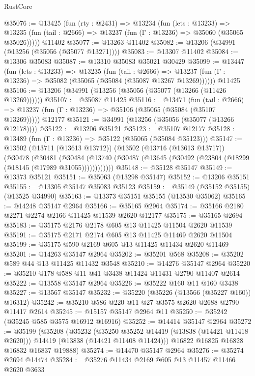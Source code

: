 \begin{lexlean}{RustCore}
\begin{coremodule}
@35076 := @13425
    (fun (rty : @2431) =>
    @13234
      (fun (lets : @13233) =>
      @13235 (fun (tail : @2666) => @13237 (fun (Γ : @13236) => @35060 (@35065 @35026)))))
    @11402
@35077 := @13263 @11402
@35082 := @13206 (@34991 (@13256 (@35056 (@35077 @13271))))
@35083 := @13307 @11402
@35084 := @13306 @35083
@35087 := @13310 @35083 @35021 @30429
@35099 := @13447
    (fun (lets : @13233) =>
    @13235
      (fun (tail : @2666) =>
      @13237 (fun (Γ : @13236) => @35082 (@35065 (@35084 (@35087 @13267 @13269))))))
    @11425
@35106 := @13206 (@34991 (@13256 (@35056 (@35077 (@13266 (@11426 @13269))))))
@35107 := @35087 @11425
@35116 := @13471
    (fun (tail : @2666) => @13237 (fun (Γ : @13236) => @35106 (@35065 (@35084 (@35107 @13269)))))
    @12177
@35121 := @34991 (@13256 (@35056 (@35077 (@13266 @12178))))
@35122 := @13206 @35121
@35123 := @35107 @12177
@35128 := @13489 (fun (Γ : @13236) => @35122 (@35065 (@35084 @35123)))
@35147 := @13502
    (@13711 (@13613 @13712))
    (@13502
      (@13716 (@13613 @13717))
      (@30478
        (@30481
          (@30484 (@13740 (@30487 (@13645 (@30492 (@23804 (@18299 (@18145 (@17989 @31055))))))))))))
@35148 := @35128 @35147
@35149 := @13373 @35121
@35151 := @35063 (@13298 @35147)
@35152 := @13206 @35151
@35155 := @13305 @35147 @35083 @35123
@35159 := @35149 (@35152 @35155) (@13525 @34990)
@35163 := @13373 @35151 @35155 (@13530 @35062)
@35165 := @14248 @35147 @2964
@35166 := @35165 @2964
@35174 := @35166 @2180 @2271 @2274 @2166 @11425 @11539 @2620 @12177
@35175 := @35165 @2694
@35183 := @35175 @2176 @2178 @605 @13 @11425 @11504 @2620 @11539
@35191 := @35175 @2171 @2174 @605 @13 @11425 @11469 @2620 @11504
@35199 := @35175 @590 @2169 @605 @13 @11425 @11434 @2620 @11469
@35201 := @14263 @35147 @2964
@35202 := @35201 @568
@35208 := @35202 @589 @44 @13 @11425 @11432 @3548
@35210 := @14276 @35147 @2964
@35220 := @35210 @178 @588 @11 @41 @3438 @11424 @11431 @2790 @11407 @2614
@35222 := @13558 @35147 @2964
@35226 := @35222 @160 @11 @160 @3438
@35227 := @13567 @35147
@35232 := @35220 (@35226 (@13566 (@35227 @160)) @16312)
@35242 := @35210 @586 @220 @11 @27 @3575 @2620 @2688 @2790 @11417 @2614
@35245 := @15157 @35147 @2964 @11
@35250 := @35242 (@35245 @585 @3575 @16912 @16916)
@35252 := @14414 @35147 @2964
@35272 := @35199
    (@35208
      (@35232
        (@35250 @35252 @14419 (@13838 (@14421 @11418 @2620)))
        @14419
        (@13838 (@14421 @11408 @11424)))
      @16822
      @16825
      @16828
      @16832
      @16837
      @19888)
@35274 := @14470 @35147 @2964
@35276 := @35274 @2694 @14474
@35284 := @35276 @11434 @2169 @605 @13 @11457 @11466 @2620 @3633

\end{coremodule}
\end{lexlean}
